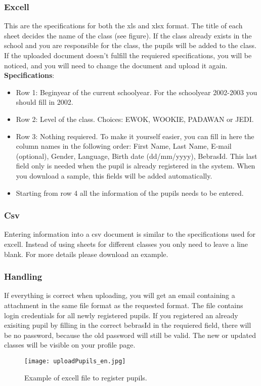 \documentclass[11pt,a4paper]{report}
\begin{document}
\subsubsection{Excell}
This are the specifications for both the xls and xlsx format. The title of each sheet decides the name of the class (see figure).  If the class already exists in the school and you are responsible for the class, the pupils will be added to the class. If the uploaded document doesn't fulfill the requiered specifications, you will be noticed, and you will need to change the document and upload it again.
\\ \textbf{Specifications}:
\begin{itemize}
\item Row 1: Beginyear of the current schoolyear. For the schoolyear 2002-2003 you should fill in 2002.
\item Row 2: Level of the class. Choices: EWOK, WOOKIE, PADAWAN or JEDI.
\item Row 3: Nothing requiered. To make it yourself easier, you can fill in here the column names in the following order: First Name, Last Name, E-mail (optional), Gender, Language, Birth date (dd/mm/yyyy), BebrasId. This last field only is needed when the pupil is already registered in the system. When you download a sample, this fields will be added automatically.
\item Starting from row 4 all the information of the pupils needs to be entered.
\end{itemize}
\subsubsection{Csv}
Entering information into a csv document is similar to the specifications used for excell. Instead of using sheets for different classes you only need to leave a line blank. For more details please download an example.
\subsubsection{Handling}
If everything is correct when uploading, you will get an email containing a attachment in the same file format as the requested format. The file contains login credentials for all newly registered pupils. If you registered an already exisiting pupil by filling in the correct bebrasId in the requiered field, there will be no password, because the old password will still be valid. The new or updated classes will be visible on your profile page.
\begin{figure}[h!]
\centering
\texttt{[image: uploadPupils\_en.jpg]}
\caption{Example of excell file to register pupils.}
\label{fig:uploadPupils}
\end{figure}
\end{document}
